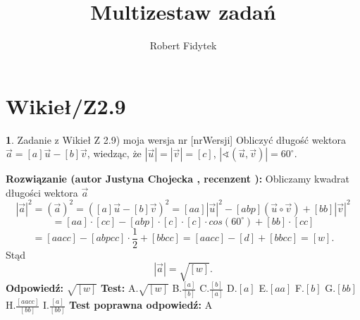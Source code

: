 \documentclass[12pt, a4paper]{article}
\title{Multizestaw zadań}
\author{Robert Fidytek}
\date{}
\theoremstyle{definition} %
\newtheorem{zad}{}
\newcommand{\kategoria}[1]{\section{#1}} %
\newcommand{\zadStart}[1]{\begin{zad}#1\newline} %
\newcommand{\zadStop}{\end{zad}}   %
\newcommand{\rozwStart}[2]{\noindent \textbf{Rozwiązanie (autor #1 , recenzent #2): }\newline} %
\newcommand{\rozwStop}{\newline}                                            %
\newcommand{\odpStart}{\noindent \textbf{Odpowiedź:}\newline}    %
\newcommand{\odpStop}{\newline}                                             %
\newcommand{\testStart}{\noindent \textbf{Test:}\newline} %
\newcommand{\testStop}{\newline} %
\newcommand{\kluczStart}{\noindent \textbf{Test poprawna odpowiedź:}\newline} %
\newcommand{\kluczStop}{\newline} %
\begin{document}
\maketitle


\kategoria{Wikieł/Z2.9}
\zadStart{Zadanie z Wikieł Z 2.9) moja wersja nr [nrWersji]}
Obliczyć długość wektora $\overrightarrow{a}=[a]\overrightarrow{u}-[b]\overrightarrow{v}$, wiedząc, że $|\overrightarrow{u}|=|\overrightarrow{v}|=[c]$, $|\sphericalangle (\overrightarrow{u},\overrightarrow{v})|=60^{\circ}$.
\zadStop
\rozwStart{Justyna Chojecka}{}
Obliczamy kwadrat długości wektora $\overrightarrow{a}$
$$|\overrightarrow{a}|^{2}=(\overrightarrow{a})^{2}=\left([a]\overrightarrow{u}-[b]\overrightarrow{v}\right)^{2}=[aa]|\overrightarrow{u}|^{2}-[abp](\overrightarrow{u}\circ\overrightarrow{v})+[bb]|\overrightarrow{v}|^{2}$$$$=[aa]\cdot[cc]-[abp]\cdot [c] \cdot [c] \cdot cos(60^{\circ})+[bb]\cdot [cc]$$$$=[aacc]-[abpcc]\cdot \frac{1}{2}+[bbcc]=[aacc]-[d]+[bbcc]=[w].$$
Stąd 
$$|\overrightarrow{a}|=\sqrt{[w]}.$$
\rozwStop
\odpStart
$\sqrt{[w]}$
\odpStop
\testStart
A.$\sqrt{[w]}$
B.$\frac{[a]}{[b]}$
C.$\frac{[b]}{[a]}$
D.$[a]$
E.$[aa]$
F.$[b]$
G.$[bb]$
H.$\frac{[aacc]}{[bb]}$
I.$\frac{[a]}{[bb]}$
\testStop
\kluczStart
A
\kluczStop
\end{document}

